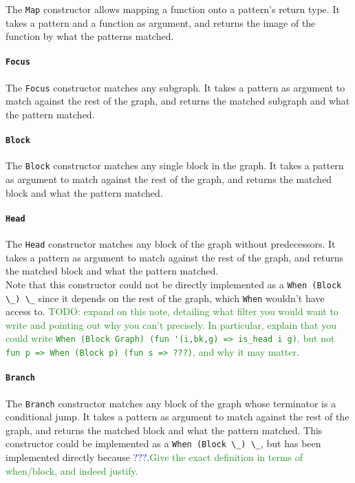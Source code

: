 \documentclass[11pt]{article}
\newcommand{\inlinecoq}[1]{\mbox{\lstinline[style=customcoq,columns=fixed,basewidth=.48em]{#1}}}
\newcommand{\ilc}[1]{\inlinecoq{#1}}
\newcommand{\leon}[1]{\textcolor{blue}{#1}}
\newcommand{\yz}[1]{\textcolor{ForestGreen}{#1}}
\begin{document}
The \ilc{Map} constructor allows mapping a function onto a pattern's return type.
It takes a pattern and a function as argument, and returns the image of the function by what the patterns matched.

\paragraph{\ilc{Focus}}

The \ilc{Focus} constructor matches any subgraph.
It takes a pattern as argument to match against the rest of the graph, and returns the matched subgraph and what the pattern matched.

\paragraph{\ilc{Block}}

The \ilc{Block} constructor matches any single block in the graph.
It takes a pattern as argument to match against the rest of the graph, and returns the matched block and what the pattern matched.

\paragraph{\ilc{Head}}

The \ilc{Head} constructor matches any block of the graph without predecessors.
It takes a pattern as argument to match against the rest of the graph, and returns the matched block and what the pattern matched.\\
Note that this constructor could not be directly implemented as a \ilc{When (Block \_) \_} since it depends on the rest of the graph, which \ilc{When} wouldn't have access to.
\yz{TODO: expand on this note, detailing what filter you would want to write and pointing out why you can't precisely.
In particular, explain that you could write \ilc{When (Block Graph) (fun '(i,bk,g) => is_head i g)}, but not \ilc{fun p => When (Block p) (fun s => ???)}, and why it may matter.}

\paragraph{\ilc{Branch}}

The \ilc{Branch} constructor matches any block of the graph whose terminator is a conditional jump.
It takes a pattern as argument to match against the rest of the graph, and returns the matched block and what the pattern matched.
This constructor could be implemented as a \ilc{When (Block \_) \_}, but has been implemented directly because \leon{???}.\yz{Give the exact definition in terms of when/block, and indeed justify.}
\end{document}
